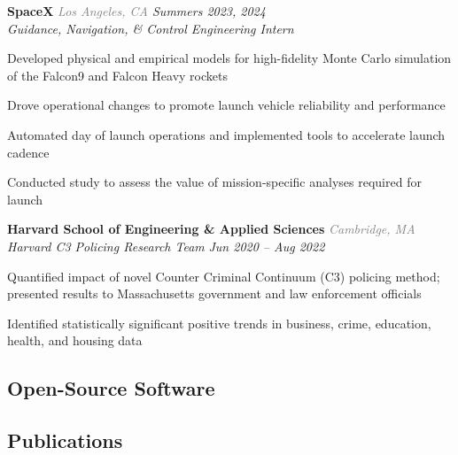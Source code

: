 \documentclass[12pt,letterpaper]{article}
\begin{document}
\textbf{SpaceX} {\small\textit{\textcolor{gray}{Los Angeles, CA} \hfill \textcolor{niceblue}{Summers 2023, 2024}}}\\
\textit{Guidance, Navigation, \& Control Engineering Intern}
\begin{bulletdescription}
      \item
            Developed physical and empirical models for high-fidelity Monte Carlo simulation of the Falcon9 and Falcon Heavy rockets
      \item
            Drove operational changes to promote launch vehicle reliability and performance
      \item
            Automated day of launch operations and implemented tools to accelerate launch cadence
      \begin{bulletdescription}
            \item
                  Conducted study to assess the value of mission-specific analyses required for launch
      \end{bulletdescription}
\end{bulletdescription}

\vspace{7pt}

\textbf{Harvard School of Engineering \& Applied Sciences} {\small\textit{\textcolor{gray}{Cambridge, MA}}}\\
\textit{Harvard C3 Policing Research Team} {\small \textit{\hfill \textcolor{niceblue}{Jun 2020 -- Aug 2022}}}
\begin{bulletdescription}
      \item
            Quantified impact of novel Counter Criminal Continuum (C3) policing method; presented results to Massachusetts government and law enforcement officials
      \item
            Identified statistically significant positive trends in business, crime, education, health, and housing data
\end{bulletdescription}

\subsection{Open-Source Software}
\begin{list}{}{\cvlist}
  
\end{list}

\ifdefined\withpubs
  \subsection{Publications}
  
\end{document}

